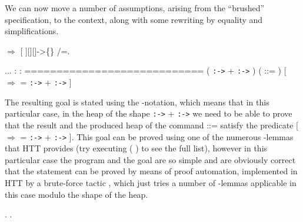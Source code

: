 \coqdocemptyline
We can now move a number of assumptions, arising from the ``brushed''
specification, to the context, along with some rewriting by equality
and simplifications.
\begin{coqdoccode}
\coqdocemptyline
\coqdocnoindent
{}\ensuremath{\Rightarrow} [ ][][]->\{\} \coqdocvar{\_} /=.\coqdoceol
\coqdocemptyline
\end{coqdoccode}
\coqdoceol
\coqdocemptyline
\coqdocindent{1.00em}
...\coqdoceol
\coqdocindent{1.00em}
 : \coqdoceol
\coqdocindent{1.00em}
 : \coqdoceol
\coqdocindent{1.00em}
============================\coqdoceol
\coqdocindent{1.50em}
 ( \texttt{:->}  +  \texttt{:->} ) ( ::= ) [ \coqdocvar{\_}  \ensuremath{\Rightarrow}  =  \texttt{:->}  +  \texttt{:->} ]

\coqdocemptyline
{}
The resulting goal is stated using the -notation, which means
that in this particular case, in the heap of the shape  \texttt{:->}  + 
\texttt{:->}  we need to be able to prove that the result and the produced
heap of the command  ::=  satisfy the predicate [ \coqdocvar{\_}  \ensuremath{\Rightarrow}  =
 \texttt{:->}  +  \texttt{:->} ]. This goal can be proved using one of the
numerous -lemmas that HTT provides (try executing  \coqdocvar{\_}
( \coqdocvar{\_} \coqdocvar{\_} \coqdocvar{\_}) to see the full list), however in this particular case
the program and the goal are so simple and are obviously correct that
the statement can be proved by means of proof automation, implemented
in HTT by a brute-force tactic , which just tries a number of
-lemmas applicable in this case modulo the shape of the heap.
\begin{coqdoccode}
\coqdocemptyline
\coqdocnoindent
{} .\coqdoceol
\coqdocnoindent
{}.\coqdoceol
\coqdocemptyline
\end{coqdoccode}
